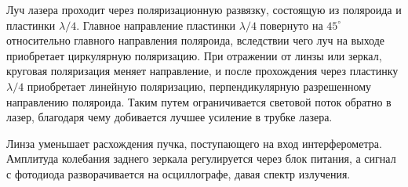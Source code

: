Луч лазера проходит через поляризационную развязку, состоящую из поляроида и пластинки $\lambda/4$. Главное направление пластинки $\lambda/4$ повернуто на $45^\circ$ относительно главного направления поляроида, вследствии чего луч на выходе приобретает циркулярную поляризацию. При отражении от линзы или зеркал, круговая поляризация меняет направление, и после прохождения через пластинку $\lambda/4$ приобретает линейную поляризацию, перпендикулярную разрешенному направлению поляроида. Таким путем ограничивается световой поток обратно в лазер, благодаря чему добивается лучшее усиление в трубке лазера.

Линза уменьшает расхождения пучка, поступающего на вход интерферометра. Амплитуда колебания заднего зеркала регулируется через блок питания, а сигнал с фотодиода разворачивается на осциллографе, давая спектр излучения.
 
